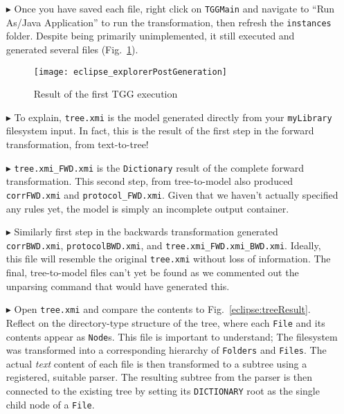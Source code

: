 \begin{enumerate} 

\item[$\blacktriangleright$] Once you have saved each file, right click on \texttt{TGGMain} and navigate to ``Run As/Java Application'' to run the
transformation, then refresh the \texttt{instances} folder. Despite being primarily unimplemented, it still executed and generated several files
(Fig.~\ref{eclipse:postParse}).

\vspace{0.5cm}

\begin{figure}[!htbp]
\begin{center}
 \texttt{[image: eclipse\_explorerPostGeneration]}
  \caption{Result of the first TGG execution}
  \label{eclipse:postParse}
\end{center}
\end{figure} 

\item[$\blacktriangleright$] To explain, \texttt{tree.xmi} is the model generated directly from your \texttt{my\-Lib\-rary} filesystem input. In fact, this is
the result of the first step in the forward transformation, from text-to-tree!

\item[$\blacktriangleright$] \texttt{tree.xmi\_FWD.xmi} is the \texttt{Dictionary} result of the complete forward transformation. This second step, from
tree-to-model also produced \texttt{corrFWD.xmi} and \texttt{protocol\_FWD.xmi}. Given that we haven't actually specified any rules yet, the model is simply an
incomplete output container.

\clearpage

\item[$\blacktriangleright$] Similarly first step in the  backwards transformation generated \texttt{corr\-BWD\-.xmi}, \texttt{protocolBWD.xmi}, and
\texttt{tree.xmi\_FWD.xmi\_BWD.xmi}. Ideally, this file will resemble the original \texttt{tree.xmi} without loss of information. The final, tree-to-model files
can't yet be found as we commented out the unparsing command that would have generated this.

\item[$\blacktriangleright$] Open \texttt{tree.xmi} and compare the contents to Fig.~\ref{eclipse:treeResult}. Reflect on the directory-type structure of the
tree, where each \texttt{File} and its contents appear as \texttt{Node}s. This file is important to understand; The filesystem was transformed into a
corresponding hierarchy of \texttt{Folders} and \texttt{Files}. The actual \emph{text} content of each file is then transformed to a subtree using a registered,
suitable parser. The resulting subtree from the parser is then connected to the existing tree by setting its \texttt{DICTIONARY} root as the single child node
of a \texttt{File}.

\end{enumerate}

